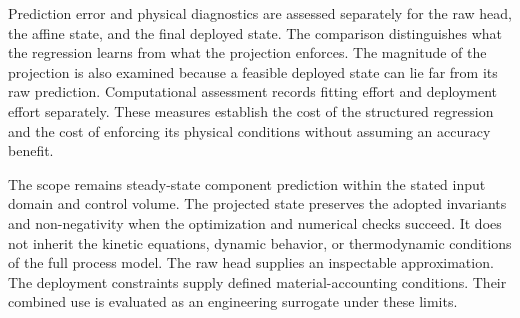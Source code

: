 Prediction error and physical diagnostics are assessed separately for the raw head, the affine state, and the final deployed state. The comparison distinguishes what the regression learns from what the projection enforces. The magnitude of the projection is also examined because a feasible deployed state can lie far from its raw prediction. Computational assessment records fitting effort and deployment effort separately. These measures establish the cost of the structured regression and the cost of enforcing its physical conditions without assuming an accuracy benefit.

The scope remains steady-state component prediction within the stated input domain and control volume. The projected state preserves the adopted invariants and non-negativity when the optimization and numerical checks succeed. It does not inherit the kinetic equations, dynamic behavior, or thermodynamic conditions of the full process model. The raw head supplies an inspectable approximation. The deployment constraints supply defined material-accounting conditions. Their combined use is evaluated as an engineering surrogate under these limits.

